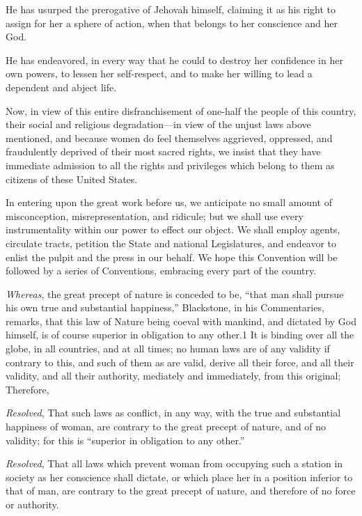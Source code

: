 \documentclass{article}
\begin{document}
He has usurped the prerogative of Jehovah himself, claiming it as his right to
assign for her a sphere of action, when that belongs to her conscience and her
God.

He has endeavored, in every way that he could to destroy her confidence in her
own powers, to lessen her self-respect, and to make her willing to lead a
dependent and abject life.

Now, in view of this entire disfranchisement of one-half the people of this
country, their social and religious degradation—in view of the unjust laws
above mentioned, and because women do feel themselves aggrieved, oppressed, and
fraudulently deprived of their most sacred rights, we insist that they have
immediate admission to all the rights and privileges which belong to them as
citizens of these United States.

In entering upon the great work before us, we anticipate no small amount of
misconception, misrepresentation, and ridicule; but we shall use every
instrumentality within our power to effect our object. We shall employ agents,
circulate tracts, petition the State and national Legislatures, and endeavor to
enlist the pulpit and the press in our behalf. We hope this Convention will be
followed by a series of Conventions, embracing every part of the country.

\clearpage

\emph{Whereas}, the great precept of nature is conceded to be, ``that man shall
pursue his own true and substantial happiness,'' Blackstone, in his
Commentaries, remarks, that this law of Nature being coeval with mankind, and
dictated by God himself, is of course superior in obligation to any other.1  It
is binding over all the globe, in all countries, and at all times; no human
laws are of any validity if contrary to this, and such of them as are valid,
derive all their force, and all their validity, and all their authority,
mediately and immediately, from this original; Therefore,

\emph{Resolved}, That such laws as conflict, in any way, with the true and
substantial happiness of woman, are contrary to the great precept of nature,
and of no validity; for this is ``superior in obligation to any other.''

\emph{Resolved}, That all laws which prevent woman from occupying such a
station in society as her conscience shall dictate, or which place her in a
position inferior to that of man, are contrary to the great precept of nature,
and therefore of no force or authority.
\end{document}

